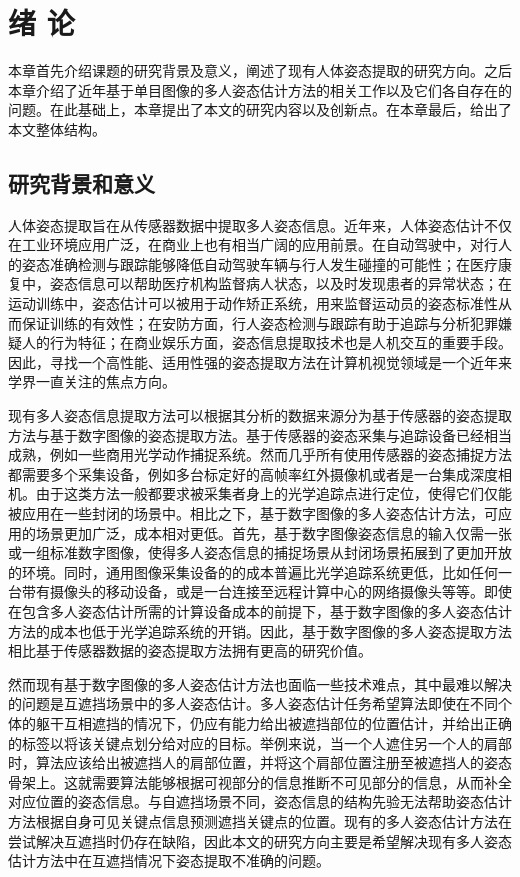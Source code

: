 \chapter{绪 论}
\label{cha:intro}

本章首先介绍课题的研究背景及意义，阐述了现有人体姿态提取的研究方向。之后本章介绍了近年基于单目图像的多人姿态估计方法的相关工作以及它们各自存在的问题。在此基础上，本章提出了本文的研究内容以及创新点。在本章最后，给出了本文整体结构。

\section{研究背景和意义}
\label{sec:generalbackground}
人体姿态提取旨在从传感器数据中提取多人姿态信息。近年来，人体姿态估计不仅在工业环境应用广泛，在商业上也有相当广阔的应用前景。在自动驾驶中，对行人的姿态准确检测与跟踪能够降低自动驾驶车辆与行人发生碰撞的可能性；在医疗康复中，姿态信息可以帮助医疗机构监督病人状态，以及时发现患者的异常状态；在运动训练中，姿态估计可以被用于动作矫正系统，用来监督运动员的姿态标准性从而保证训练的有效性；在安防方面，行人姿态检测与跟踪有助于追踪与分析犯罪嫌疑人的行为特征；在商业娱乐方面，姿态信息提取技术也是人机交互的重要手段。因此，寻找一个高性能、适用性强的姿态提取方法在计算机视觉领域是一个近年来学界一直关注的焦点方向。

现有多人姿态信息提取方法可以根据其分析的数据来源分为基于传感器的姿态提取方法与基于数字图像的姿态提取方法。基于传感器的姿态采集与追踪设备已经相当成熟，例如一些商用光学动作捕捉系统。然而几乎所有使用传感器的姿态捕捉方法都需要多个采集设备，例如多台标定好的高帧率红外摄像机或者是一台集成深度相机。由于这类方法一般都要求被采集者身上的光学追踪点进行定位，使得它们仅能被应用在一些封闭的场景中。相比之下，基于数字图像的多人姿态估计方法，可应用的场景更加广泛，成本相对更低。首先，基于数字图像姿态信息的输入仅需一张或一组标准数字图像，使得多人姿态信息的捕捉场景从封闭场景拓展到了更加开放的环境。同时，通用图像采集设备的的成本普遍比光学追踪系统更低，比如任何一台带有摄像头的移动设备，或是一台连接至远程计算中心的网络摄像头等等。即使在包含多人姿态估计所需的计算设备成本的前提下，基于数字图像的多人姿态估计方法的成本也低于光学追踪系统的开销。因此，基于数字图像的多人姿态提取方法相比基于传感器数据的姿态提取方法拥有更高的研究价值。

然而现有基于数字图像的多人姿态估计方法也面临一些技术难点，其中最难以解决的问题是互遮挡场景中的多人姿态估计。多人姿态估计任务希望算法即使在不同个体的躯干互相遮挡的情况下，仍应有能力给出被遮挡部位的位置估计，并给出正确的标签以将该关键点划分给对应的目标。举例来说，当一个人遮住另一个人的肩部时，算法应该给出被遮挡人的肩部位置，并将这个肩部位置注册至被遮挡人的姿态骨架上。这就需要算法能够根据可视部分的信息推断不可见部分的信息，从而补全对应位置的姿态信息。与自遮挡场景不同，姿态信息的结构先验无法帮助姿态估计方法根据自身可见关键点信息预测遮挡关键点的位置。现有的多人姿态估计方法在尝试解决互遮挡时仍存在缺陷，因此本文的研究方向主要是希望解决现有多人姿态估计方法中在互遮挡情况下姿态提取不准确的问题。

